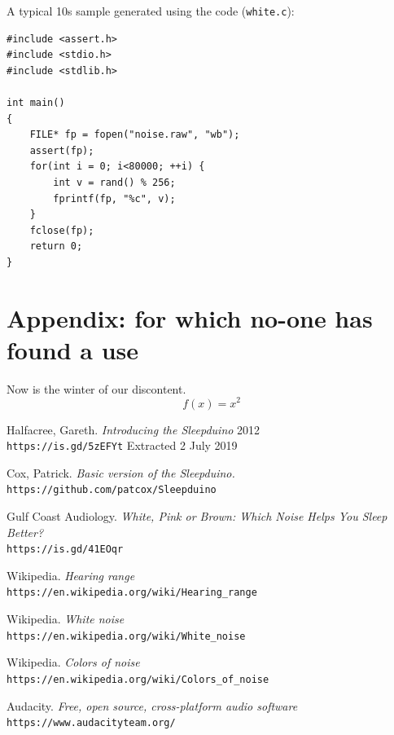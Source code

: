\documentclass[a4paper,10pt]{article}
\def\code#1{\texttt{#1}}
\begin{document}
A typical 10s sample generated using the code (\code{white.c}):
\begin{Verbatim}[tabsize=8]
#include <assert.h>
#include <stdio.h>
#include <stdlib.h>

int main()
{
	FILE* fp = fopen("noise.raw", "wb");
	assert(fp);
	for(int i = 0; i<80000; ++i) {
		int v = rand() % 256;
		fprintf(fp, "%c", v);
	}
	fclose(fp);
	return 0;
}
\end{Verbatim}





\appendix

\section{Appendix: for which no-one has found a use}

Now is the winter of our discontent.
\begin{equation*}
  f(x) = x^2
\end{equation*}

\begin{thebibliography}{9}
 
Halfacree, Gareth.
\textit{Introducing the Sleepduino}
2012 
\\\texttt{https://is.gd/5zEFYt}
Extracted 2 July 2019



Cox, Patrick.
\textit{Basic version of the Sleepduino.}
\\\texttt{https://github.com/patcox/Sleepduino}

Gulf Coast Audiology.
\textit{White, Pink or Brown: Which Noise Helps You Sleep Better?}
\\\texttt{https://is.gd/41EOqr}

Wikipedia.
\textit{Hearing range}
\\\texttt{https://en.wikipedia.org/wiki/Hearing\_range}

Wikipedia.
\textit{White noise}
\\\texttt{https://en.wikipedia.org/wiki/White\_noise}

Wikipedia.
\textit{Colors of noise}
\\\texttt{https://en.wikipedia.org/wiki/Colors\_of\_noise}

Audacity.
\textit{Free, open source, cross-platform audio software}
\\\texttt{https://www.audacityteam.org/}

\end{thebibliography}
\end{document}
